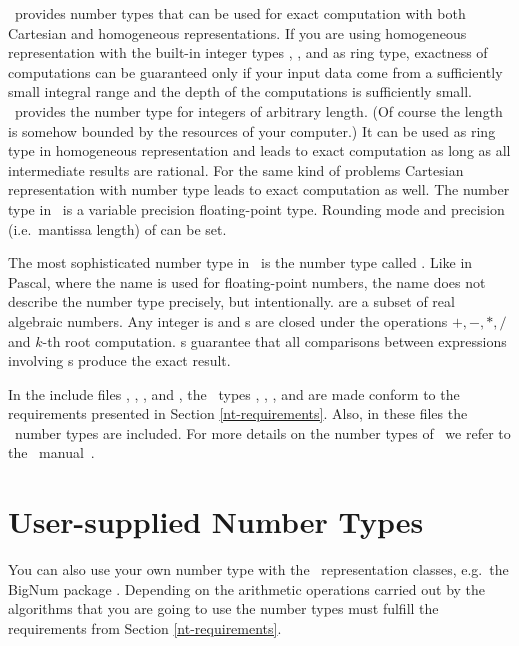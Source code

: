 \leda\ provides number types that can be used for exact computation 
with both Cartesian and homogeneous representations.  If you are using
homogeneous representation with the built-in integer types
, , and  as ring type, exactness of
computations can be guaranteed only if your input data come from a
sufficiently small integral range and the depth of the computations is
sufficiently small.  \leda\ provides the number type  for
integers of arbitrary length. (Of course the length is
somehow bounded by the resources of your computer.)  It can be used as
ring type in homogeneous representation and leads to exact
computation as long as all intermediate results are rational.  For the
same kind of problems Cartesian representation with number type
 leads to exact computation as well.
The number type  in \leda\ is a variable precision
floating-point type. Rounding mode and precision (i.e.\ mantissa length) of
 can be set. 

The most sophisticated number type in \leda\ is the number type called
. Like in Pascal, where the name  is used for
floating-point numbers, the name  does not describe the
number type precisely, but intentionally.  
 are a subset of real algebraic
numbers.  Any integer is  and s are closed under
the operations $+,-,*,/$ and $k$-th root computation. 
s guarantee that
all comparisons between expressions involving s produce the
exact result.

In the include files , , 
, and , 
the \leda\ types , ,
, 
and  are made conform to the requirements presented in
Section \ref{nt-requirements}. 
Also, in these files the \leda\ number types are included.
For more details on the number types of \leda\ we refer to the \leda\ 
manual~\cite{mnsu-lum}.




\section{User-supplied Number Types}

You can also use your own number type with the \cgal\ representation
classes, e.g.\  the {\sc BigNum} package \cite{svh-bpepa-89}.
Depending on the arithmetic operations carried out by the algorithms
that you are going to use the number types must fulfill the
requirements from Section \ref{nt-requirements}. 
